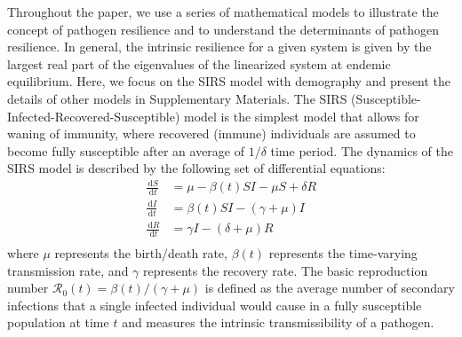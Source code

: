 \documentclass[12pt]{article}
\newcommand{\dd}[1]{\ensuremath{\, \mathrm{d}#1}}
\begin{document}
Throughout the paper, we use a series of mathematical models to illustrate the concept of pathogen resilience and to understand the determinants of pathogen resilience.
In general, the intrinsic resilience for a given system is given by the largest real part of the eigenvalues of the linearized system at endemic equilibrium.
Here, we focus on the SIRS model with demography and present the details of other models in Supplementary Materials.
The SIRS (Susceptible-Infected-Recovered-Susceptible) model is the simplest model that allows for waning of immunity, where recovered (immune) individuals are assumed to become fully susceptible after an average of $1/\delta$ time period.
The dynamics of the SIRS model is described by the following set of differential equations:
\begin{align}
\frac{\dd S}{\dd t} &= \mu - \beta(t) SI - \mu S + \delta R \\
\frac{\dd I}{\dd t} &= \beta(t) SI - (\gamma + \mu) I \\
\frac{\dd R}{\dd t} &= \gamma I - (\delta + \mu) R \\
\end{align}
where $\mu$ represents the birth/death rate, $\beta(t)$ represents the time-varying transmission rate, and $\gamma$ represents the recovery rate.
The basic reproduction number $\mathcal R_0(t) = \beta(t)/(\gamma + \mu)$ is defined as the average number of secondary infections that a single infected individual would cause in a fully susceptible population at time $t$ and measures the intrinsic transmissibility of a pathogen.
\end{document}

